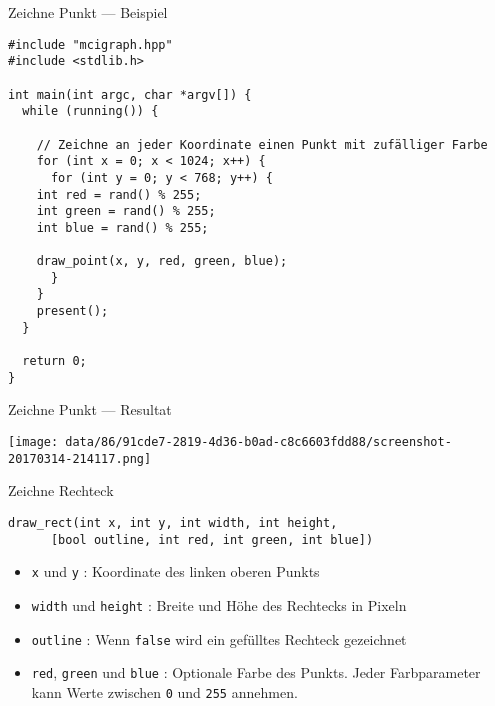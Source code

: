 \documentclass[presentation]{beamer}
\begin{document}
\begin{frame}[label={sec:org219f5f2},fragile]{Zeichne Punkt --- Beispiel}
 \begin{verbatim}
#include "mcigraph.hpp"
#include <stdlib.h>

int main(int argc, char *argv[]) {
  while (running()) {

    // Zeichne an jeder Koordinate einen Punkt mit zufälliger Farbe
    for (int x = 0; x < 1024; x++) {
      for (int y = 0; y < 768; y++) {
	int red = rand() % 255;
	int green = rand() % 255;
	int blue = rand() % 255;

	draw_point(x, y, red, green, blue);
      }
    }
    present();
  }

  return 0;
}
\end{verbatim}
\end{frame}
\begin{frame}[label={sec:orgef06fd5}]{Zeichne Punkt --- Resultat}
\begin{center}
\texttt{[image: data/86/91cde7-2819-4d36-b0ad-c8c6603fdd88/screenshot-20170314-214117.png]}
\end{center}
\end{frame}
\begin{frame}[label={sec:orgf79a89c},fragile]{Zeichne Rechteck}
 \begin{verbatim}
draw_rect(int x, int y, int width, int height,
	  [bool outline, int red, int green, int blue])
\end{verbatim}
\begin{itemize}
\item {\color{solarizedYellow}\verb!x!} und {\color{solarizedYellow}\verb!y!} : Koordinate des linken oberen Punkts
\item {\color{solarizedYellow}\verb!width!} und {\color{solarizedYellow}\verb!height!} : Breite und Höhe des Rechtecks in Pixeln
\item {\color{solarizedYellow}\verb!outline!} : Wenn {\color{solarizedYellow}\verb!false!} wird ein gefülltes Rechteck gezeichnet
\item {\color{solarizedYellow}\verb!red!}, {\color{solarizedYellow}\verb!green!} und {\color{solarizedYellow}\verb!blue!} : Optionale Farbe des Punkts. Jeder
Farbparameter kann Werte zwischen {\color{solarizedYellow}\verb!0!} und {\color{solarizedYellow}\verb!255!} annehmen.
\end{itemize}
\end{frame}
\end{document}
